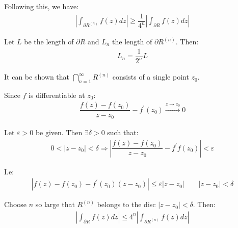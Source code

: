 \begin{prf}[]{}
  \par\bigskip
  \noindent Following this, we have:
  \begin{equation*}
    \begin{gathered}
      \left|\int_{\partial R^{(n)}}f(z)dz\right|\geq\dfrac{1}{4^n}\left|\int_{\partial R}f(z)dz\right|
    \end{gathered}
  \end{equation*}
  \par\bigskip
  \noindent Let $L$ be the length of $\partial R$ and $L_n$ the length of $\partial R^{(n)}$. Then:
  \begin{equation*}
    \begin{gathered}
      L_n = \dfrac{1}{2^n}L
    \end{gathered}
  \end{equation*}
  \par\bigskip
  \noindent It can be shown that $\bigcap_{n=1}^{\infty}R^{(n)}$ consists of a single point $z_0$.\par
  \noindent Since $f$ is differentiable at $z_0$:
  \begin{equation*}
    \begin{gathered}
      \dfrac{f(z)-f(z_0)}{z-z_0}-f^{\prime}(z_0)\stackrel{z\to z_0}{\to}0
    \end{gathered}
  \end{equation*}
  \par\bigskip
  \noindent Let $\varepsilon>0$ be given. Then $\exists \delta>0$ such that:
  \begin{equation*}
    \begin{gathered}
      0<\left|z-z_0\right|<\delta\Rightarrow \left|\dfrac{f(z)-f(z_0)}{z-z_0}-f^{\prime}f(z_0)\right|<\varepsilon
    \end{gathered}
  \end{equation*}\par
  \noindent I.e:
  \begin{equation*}
    \begin{gathered}
      \left|f(z)-f(z_0)-f^{\prime}(z_0)(z-z_0)\right|\leq \varepsilon\left|z-z_0\right|\qquad \left|z-z_0\right|<\delta
    \end{gathered}
  \end{equation*}
  \par\bigskip
  \noindent Choose $n$ so large that $R^{(n)}$ belongs to the disc $\left|z-z_0\right|<\delta$. Then:
  \begin{equation*}
    \begin{gathered}
      \left|\int_{\partial R}f(z)dz\right|\leq 4^n\left|\int_{\partial R^{(n)}}f(z)dz\right|\\

\end{gathered}
\end{equation*}
\end{prf}
